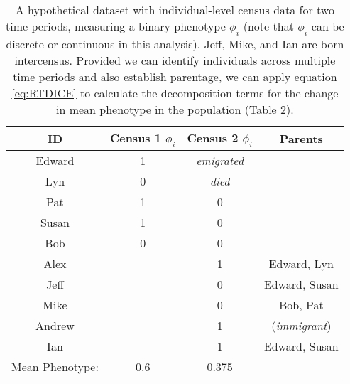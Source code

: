 \documentclass[11pt]{article}
\begin{document}
    \begin{table}[htbp]
    \begin{center}
    \begin{footnotesize}
    \begin{tabular}{cccc}
    \hline
    \hline
    ID    & Census 1 $\phi_i$ & Census 2 $\phi_i$ & Parents \\
    \hline
    Edward & 1     & \textit{emigrated} &  \\
    Lyn   & 0     & \textit{died}  &  \\
    Pat   & 1     & 0     &  \\
    Susan & 1     & 0     &  \\
    Bob   & 0     & 0     &  \\
    Alex      &   & 1     & Edward, Lyn \\
    Jeff      &   & 0     & Edward, Susan \\
    Mike      &    & 0     & Bob, Pat \\
    Andrew      &  & 1     & (\textit{immigrant})\\
    Ian      &     & 1     & Edward, Susan \\
    \hline
    Mean Phenotype: & 0.6 & 0.375 & \\
    \hline
    
     \end{tabular}
    \caption{A hypothetical dataset with individual-level census data for two time periods, measuring a binary phenotype $\phi_i$ (note that $\phi_i$ can be discrete or continuous in this analysis).  Jeff, Mike, and Ian are born intercensus.  Provided we can identify individuals across multiple time periods and also establish parentage, we can apply equation \ref{eq:RTDICE} to calculate the decomposition terms for the change in mean phenotype in the population (Table 2).}
    \label{tab:DemoData}
    \end{footnotesize}
    \end{center}
    \end{table}
\end{document}
